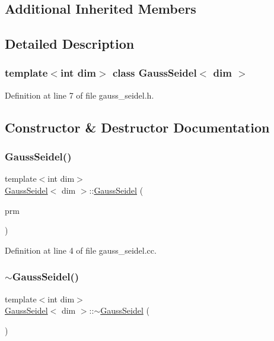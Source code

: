 \subsection*{Additional Inherited Members}


\subsection{Detailed Description}
\subsubsection*{template$<$int dim$>$\newline
class Gauss\+Seidel$<$ dim $>$}



Definition at line 7 of file gauss\+\_\+seidel.\+h.



\subsection{Constructor \& Destructor Documentation}
\mbox{\label{class_gauss_seidel_a6024b3a7447aa8fb1cd0bd513c1af81e}} 
\subsubsection{\texorpdfstring{Gauss\+Seidel()}{GaussSeidel()}}
{\footnotesize\ttfamily template$<$int dim$>$ \\
\hyperlink{class_gauss_seidel}{Gauss\+Seidel}$<$ dim $>$\+::\hyperlink{class_gauss_seidel}{Gauss\+Seidel} (\begin{DoxyParamCaption}\item[{const Parameter\+Handler \&}]{prm }\end{DoxyParamCaption})}



Definition at line 4 of file gauss\+\_\+seidel.\+cc.

\mbox{\label{class_gauss_seidel_a4d41231183512ec5aab1fa7088c60788}} 
\subsubsection{\texorpdfstring{$\sim$\+Gauss\+Seidel()}{~GaussSeidel()}}
{\footnotesize\ttfamily template$<$int dim$>$ \\
\hyperlink{class_gauss_seidel}{Gauss\+Seidel}$<$ dim $>$\+::$\sim$\hyperlink{class_gauss_seidel}{Gauss\+Seidel} (\begin{DoxyParamCaption}{ }\end{DoxyParamCaption})}



